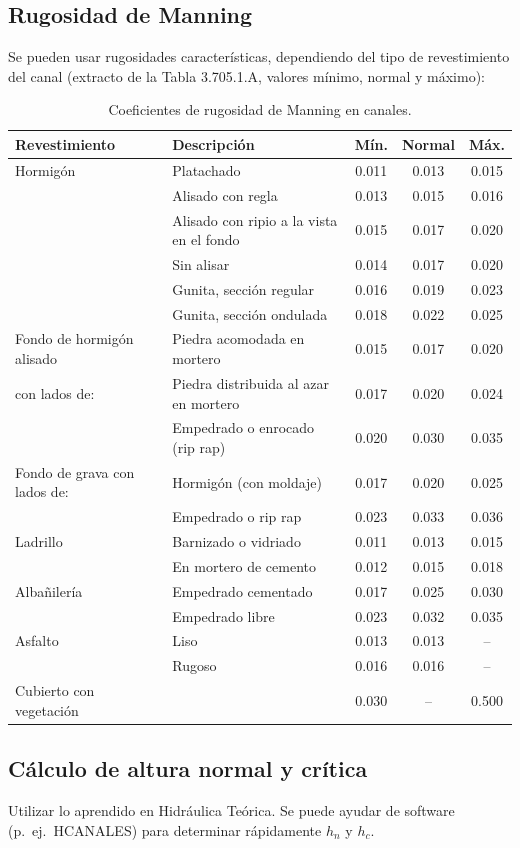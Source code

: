 \subsection{Rugosidad de Manning}
Se pueden usar rugosidades características, dependiendo del tipo de
revestimiento del canal (extracto de la Tabla 3.705.1.A, valores mínimo,
normal y máximo):
\begin{table}[H]
\centering\small
\begin{tabular}{llccc}
\toprule
\textbf{Revestimiento} & \textbf{Descripción} & \textbf{Mín.} & \textbf{Normal} & \textbf{Máx.}\\
\midrule
Hormigón & Platachado & 0.011 & 0.013 & 0.015\\
 & Alisado con regla & 0.013 & 0.015 & 0.016\\
 & Alisado con ripio a la vista en el fondo & 0.015 & 0.017 & 0.020\\
 & Sin alisar & 0.014 & 0.017 & 0.020\\
 & Gunita, sección regular & 0.016 & 0.019 & 0.023\\
 & Gunita, sección ondulada & 0.018 & 0.022 & 0.025\\
Fondo de hormigón alisado & Piedra acomodada en mortero & 0.015 & 0.017 & 0.020\\
\quad con lados de: & Piedra distribuida al azar en mortero & 0.017 & 0.020 & 0.024\\
 & Empedrado o enrocado (rip rap) & 0.020 & 0.030 & 0.035\\
Fondo de grava con lados de: & Hormigón (con moldaje) & 0.017 & 0.020 & 0.025\\
 & Empedrado o rip rap & 0.023 & 0.033 & 0.036\\
Ladrillo & Barnizado o vidriado & 0.011 & 0.013 & 0.015\\
 & En mortero de cemento & 0.012 & 0.015 & 0.018\\
Albañilería & Empedrado cementado & 0.017 & 0.025 & 0.030\\
 & Empedrado libre & 0.023 & 0.032 & 0.035\\
Asfalto & Liso & 0.013 & 0.013 & --\\
 & Rugoso & 0.016 & 0.016 & --\\
Cubierto con vegetación & & 0.030 & -- & 0.500\\
\bottomrule
\end{tabular}
\caption{Coeficientes de rugosidad de Manning en canales.}
\end{table}

\subsection{Cálculo de altura normal y crítica}
Utilizar lo aprendido en Hidráulica Teórica. Se puede ayudar de software
(p.~ej.\ HCANALES) para determinar rápidamente $h_n$ y $h_c$.

